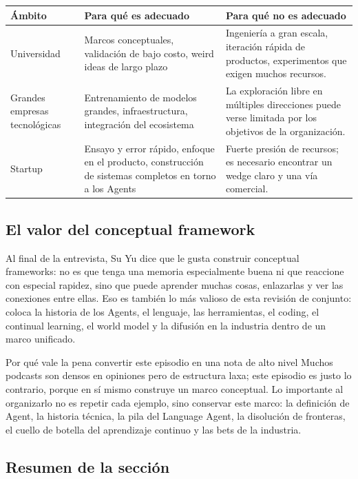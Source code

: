 \documentclass[a4paper]{article}
\begin{document}
\noindent\begin{tabularx}{\textwidth}{p{}p{}X}
\toprule
Ámbito & Para qué es adecuado & Para qué no es adecuado \\
\midrule
Universidad & Marcos conceptuales, validación de bajo costo, weird ideas de largo plazo & Ingeniería a gran escala, iteración rápida de productos, experimentos que exigen muchos recursos. \\
Grandes empresas tecnológicas & Entrenamiento de modelos grandes, infraestructura, integración del ecosistema & La exploración libre en múltiples direcciones puede verse limitada por los objetivos de la organización. \\
Startup & Ensayo y error rápido, enfoque en el producto, construcción de sistemas completos en torno a los Agents & Fuerte presión de recursos; es necesario encontrar un wedge claro y una vía comercial. \\
\bottomrule
\end{tabularx}

\subsection{El valor del conceptual framework}

Al final de la entrevista, Su Yu dice que le gusta construir conceptual frameworks: no es que tenga una memoria especialmente buena ni que reaccione con especial rapidez, sino que puede aprender muchas cosas, enlazarlas y ver las conexiones entre ellas. Eso es también lo más valioso de esta revisión de conjunto: coloca la historia de los Agents, el lenguaje, las herramientas, el coding, el continual learning, el world model y la difusión en la industria dentro de un marco unificado.

\begin{importantbox}{Por qué vale la pena convertir este episodio en una nota de alto nivel}
Muchos podcasts son densos en opiniones pero de estructura laxa; este episodio es justo lo contrario, porque en sí mismo construye un marco conceptual. Lo importante al organizarlo no es repetir cada ejemplo, sino conservar este marco: la definición de Agent, la historia técnica, la pila del Language Agent, la disolución de fronteras, el cuello de botella del aprendizaje continuo y las bets de la industria.
\end{importantbox}

\subsection{Resumen de la sección}
\end{document}
